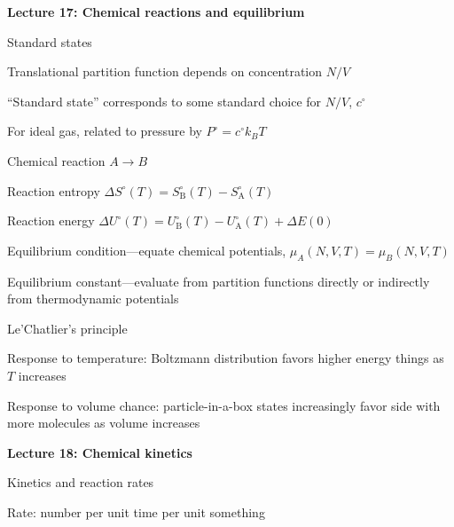 \message{ !name(Outline.tex)}\documentclass[11pt]{article}
\begin{document}
\begin{outline}
    \item {\bf Lecture 17: Chemical reactions and equilibrium}
      \begin{outline}
      \item Standard states
        \begin{outline}
          \item Translational partition function depends on concentration $N/V$
          \item ``Standard state'' corresponds to some standard choice for $N/V$, $c^\circ$
          \item For ideal gas, related to pressure by $P^\circ = c^\circ k_B T$
        \end{outline}
      \item Chemical reaction $A \rightarrow B$
      \item Reaction entropy $\Delta S^\circ (T) =  S^\circ_\mathrm{B}(T)-S^\circ_\mathrm{A}(T)$
        \item Reaction energy $\Delta U^\circ (T) =
          U^\circ_\mathrm{B}(T)-U^\circ_\mathrm{A}(T)+\Delta E(0)$
        \item Equilibrium condition---equate chemical potentials, $\mu_A(N,V,T) = \mu_B(N,V,T)$
        \item Equilibrium constant---evaluate from partition functions directly
          or indirectly from thermodynamic potentials
\item Le'Chatlier's principle
  \begin{outline}
    \item Response to temperature: Boltzmann distribution favors higher energy
      things as $T$ increases
    \item Response to volume chance: particle-in-a-box states increasingly favor
      side with more molecules as volume increases 
  \end{outline}
\end{outline}
\item {\bf Lecture 18: Chemical kinetics}
  \begin{outline}
  \item Kinetics and reaction rates
    \begin{outline}
      \item Rate: number per unit time per unit something
    \end{outline}


\end{outline}
\end{outline}
\end{document}
